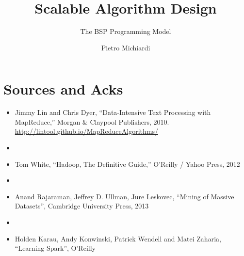 \documentclass{beamer}
\title{Scalable Algorithm Design}
\subtitle{The BSP Programming Model}
\author{Pietro Michiardi}
\institute{Eurecom}
\date
\begin{document}
\begin{frame}
  \titlepage
\end{frame}

\section{Sources and Acks}

\begin{frame}
  \begin{itemize}
    \item Jimmy Lin and Chris Dyer, ``Data-Intensive Text Processing with MapReduce,'' Morgan \& Claypool Publishers, 2010. \url{http://lintool.github.io/MapReduceAlgorithms/}

    \item[]

    \item Tom White, ``Hadoop, The Definitive Guide,'' O'Reilly / Yahoo Press, 2012

    \item[]

    \item Anand Rajaraman, Jeffrey D. Ullman, Jure Leskovec, ``Mining of Massive Datasets'', Cambridge University Press, 2013

    \item[]

    \item Holden Karau, Andy Konwinski, Patrick Wendell and Matei Zaharia, ``Learning Spark'', O'Reilly
  \end{itemize}
\end{frame}


\end{document}
